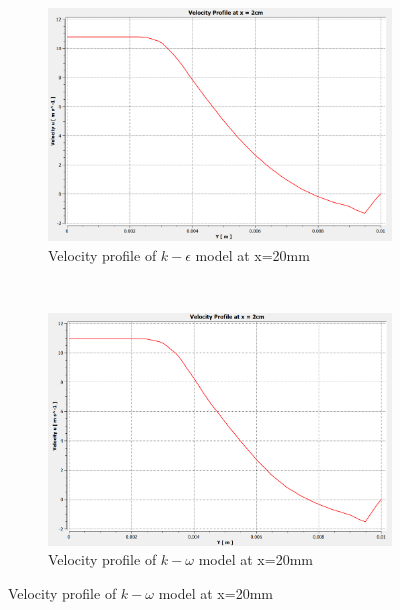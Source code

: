 \begin{figure}[H]
    \centering
     ~
    \begin{subfigure}{.48\textwidth}
    \centering
    \includegraphics[width=.95\linewidth]{images/task2/task2-1/cs5.png}
    \caption{Velocity profile of $k-\epsilon$ model at x=20mm}
\end{subfigure}
    ~
    \begin{subfigure}{.48\textwidth}
    \centering
    \includegraphics[width=.95\linewidth]{images/task2/task2-2/cs5.png}
    \caption{Velocity profile of $k-\omega$ model at x=20mm}
\end{subfigure}



\end{figure}
